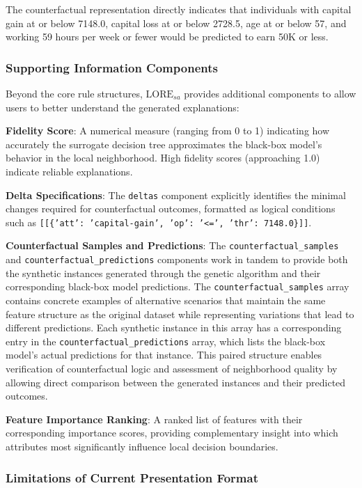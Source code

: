 The counterfactual representation directly indicates that individuals with capital gain at or below 7148.0, capital loss at or below 2728.5, age at or below 57, and working 59 hours per week or fewer would be predicted to earn 50K or less.

\subsubsection{Supporting Information Components}

Beyond the core rule structures, $\text{LORE}_{sa}$ provides additional components to allow users to better understand the generated explanations:

\textbf{Fidelity Score}: A numerical measure (ranging from 0 to 1) indicating how accurately the surrogate decision tree approximates the black-box model's behavior in the local neighborhood. High fidelity scores (approaching 1.0) indicate reliable explanations.

\textbf{Delta Specifications}: The \texttt{deltas} component explicitly identifies the minimal changes required for counterfactual outcomes, formatted as logical conditions such as \texttt{[[\{'att': 'capital-gain', 'op': '<=', 'thr': 7148.0\}]]}.

\textbf{Counterfactual Samples and Predictions}: The \texttt{counterfactual\_samples} and \texttt{counterfactual\_predictions} components work in tandem to provide both the synthetic instances generated through the genetic algorithm and their corresponding black-box model predictions. The \texttt{counterfactual\_samples} array contains concrete examples of alternative scenarios that maintain the same feature structure as the original dataset while representing variations that lead to different predictions. Each synthetic instance in this array has a corresponding entry in the \texttt{counterfactual\_predictions} array, which lists the black-box model's actual predictions for that instance. This paired structure enables verification of counterfactual logic and assessment of neighborhood quality by allowing direct comparison between the generated instances and their predicted outcomes.

\textbf{Feature Importance Ranking}: A ranked list of features with their corresponding importance scores, providing complementary insight into which attributes most significantly influence local decision boundaries.

\subsubsection{Limitations of Current Presentation Format}

